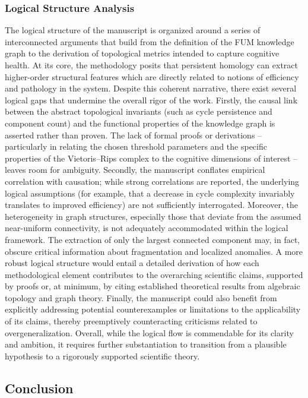 \documentclass[12pt]{article}
\begin{document}
\subsubsection{Logical Structure Analysis  }
The logical structure of the manuscript is organized around a series of interconnected arguments that build from the definition of the FUM knowledge graph to the derivation of topological metrics intended to capture cognitive health. At its core, the methodology posits that persistent homology can extract higher-order structural features which are directly related to notions of efficiency and pathology in the system. Despite this coherent narrative, there exist several logical gaps that undermine the overall rigor of the work. Firstly, the causal link between the abstract topological invariants (such as cycle persistence and component count) and the functional properties of the knowledge graph is asserted rather than proven. The lack of formal proofs or derivations – particularly in relating the chosen threshold parameters and the specific properties of the Vietoris–Rips complex to the cognitive dimensions of interest – leaves room for ambiguity. Secondly, the manuscript conflates empirical correlation with causation; while strong correlations are reported, the underlying logical assumptions (for example, that a decrease in cycle complexity invariably translates to improved efficiency) are not sufficiently interrogated. Moreover, the heterogeneity in graph structures, especially those that deviate from the assumed near-uniform connectivity, is not adequately accommodated within the logical framework. The extraction of only the largest connected component may, in fact, obscure critical information about fragmentation and localized anomalies. A more robust logical structure would entail a detailed derivation of how each methodological element contributes to the overarching scientific claims, supported by proofs or, at minimum, by citing established theoretical results from algebraic topology and graph theory. Finally, the manuscript could also benefit from explicitly addressing potential counterexamples or limitations to the applicability of its claims, thereby preemptively counteracting criticisms related to overgeneralization. Overall, while the logical flow is commendable for its clarity and ambition, it requires further substantiation to transition from a plausible hypothesis to a rigorously supported scientific theory.

\hrulefill
\subsection{Conclusion}
\end{document}

